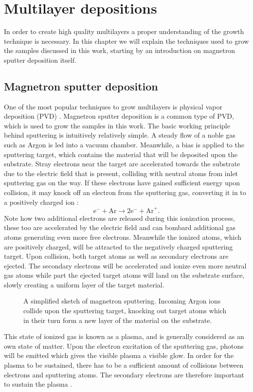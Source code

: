 \chapter{Multilayer depositions}\label{multilayerdepositions}
In order to create high quality multilayers a proper understanding of the growth technique is necessary.  In this chapter we will explain the techniques used to grow the samples discussed in this work, starting by an introduction on magnetron sputter deposition itself.

\section{Magnetron sputter deposition}
One of the most popular techniques to grow multilayers is physical vapor deposition (PVD) \cite{alvarez_garcia-martin_lopez-santos_rico_ferrer_cotrino_gonzalez-elipe_palmero_2014}.  Magnetron sputter deposition is a common type of PVD, which is used to grow the samples in this work. The basic working principle behind sputtering is intuitively relatively simple. A steady flow of a noble gas such as Argon is led into a vacuum chamber. Meanwhile, a bias is applied to the sputtering target, which contains the material that will be deposited upon the substrate. Stray electrons near the target are accelerated towards the substrate due to the electric field that is present, colliding with neutral atoms from inlet sputtering gas on the way. If these electrons have gained sufficient energy upon collision, it may knock off an electron from the sputtering gas, converting it in to a positively charged ion  \cite{ohring}:
\begin{equation}
	\text{e}^{-} + \text{Ar} \rightarrow 2\text{e}^{-} + \text{Ar}^{+}.
\end{equation}
Note how two additional electrons are released during this ionization process, these too are accelerated by the electric field and can bombard additional gas atoms generating even more free electrons. Meanwhile the ionized atoms, which are positively charged, will be attracted to the negatively charged sputtering target. Upon collision, both target atoms as well as secondary electrons are ejected. The secondary electrons will be accelerated and ionize even more neutral gas atoms while part the ejected target atoms will land on the substrate surface, slowly creating a uniform layer of the target material. 
\begin{figure}
	\centering
	\def\svgwidth{\textwidth}
	
	\caption{A simplified sketch of magnetron sputtering. Incoming Argon ions collide upon the sputtering target, knocking out target atoms which in their turn form a new layer of the material on the substrate.}
\label{magnetronsputtering}
\end{figure}
This state of ionized gas is known as a plasma, and is generally considered as an own state of matter. Upon the electron excitation of the sputtering gas, photons will be emitted which gives the visible plasma a visible glow. In order for the plasma to be sustained, there has to be a sufficient amount of collisions between electrons and sputtering atoms. The secondary electrons are therefore important to sustain the plasma \cite{ohring}.


